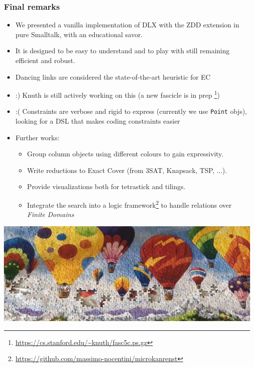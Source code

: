 \documentclass[10pt]{beamer}
\begin{document}
\begin{frame}[fragile]
\frametitle{Final remarks}
\begin{itemize}
  \item We presented a vanilla implementation of DLX with the ZDD extension
          in pure Smalltalk, with an educational savor.
  \item It is designed to be easy to understand and to play with
          still remaining efficient and robust.
  \item Dancing links are considered the state-of-the-art heuristic for EC
  \item :) Knuth is still actively working on this (a new fascicle is in prep \footnote{\url{https://cs.stanford.edu/~knuth/fasc5c.ps.gz}})
  \item :( Constraints are verbose and rigid to express (currently we use \texttt{Point} objs), 
        looking for a DSL that makes coding constraints easier
  \item Further works:
    \begin{itemize}
      \item Group column objects using different colours to gain expressivity.
      \item Write reductions to Exact Cover (from $3$SAT, Knapsack, TSP, ...).
	  \item Provide visualizations both for tetrastick and tilings.
	  \item Integrate the search into a logic framework\footnote{\url{https://github.com/massimo-nocentini/microkanrenst}} to handle
	  relations over \emph{Finite Domains}
    \end{itemize}
\end{itemize}
\end{frame}

\begin{frame}{ }
  \vfill
  \vfill
  \includegraphics[height=.5\textheight,width=\textwidth]{balloon-puzzle.jpg}
  \vfill
\end{frame}
\end{document}
